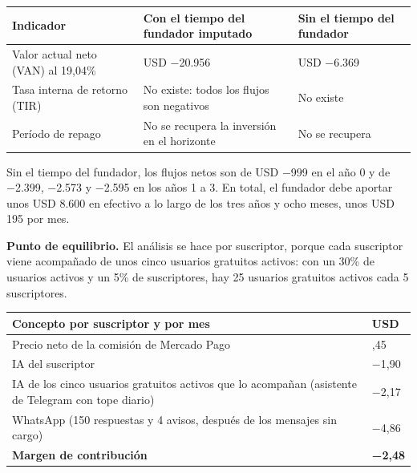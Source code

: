 {\def\LTcaptype{none} %
\begin{longtable}[]{@{}
  >{\raggedright\arraybackslash}p{}
  >{\raggedright\arraybackslash}p{}
  >{\raggedright\arraybackslash}p{}@{}}
\toprule\noalign{}
\begin{minipage}[b]{\linewidth}\raggedright
Indicador
\end{minipage} & \begin{minipage}[b]{\linewidth}\raggedright
Con el tiempo del fundador imputado
\end{minipage} & \begin{minipage}[b]{\linewidth}\raggedright
Sin el tiempo del fundador
\end{minipage} \\
\midrule\noalign{}
\endhead
\bottomrule\noalign{}
\endlastfoot
Valor actual neto (VAN) al 19,04\% & USD −20.956 & USD −6.369 \\
Tasa interna de retorno (TIR) & No existe: todos los flujos son
negativos & No existe \\
Período de repago & No se recupera la inversión en el horizonte & No se
recupera \\
\end{longtable}
}

Sin el tiempo del fundador, los flujos netos son de USD −999 en el año 0
y de −2.399, −2.573 y −2.595 en los años 1 a 3. En total, el fundador
debe aportar unos USD 8.600 en efectivo a lo largo de los tres años y
ocho meses, unos USD 195 por mes.

\textbf{Punto de equilibrio.} El análisis se hace por suscriptor, porque
cada suscriptor viene acompañado de unos cinco usuarios gratuitos
activos: con un 30\% de usuarios activos y un 5\% de suscriptores, hay
25 usuarios gratuitos activos cada 5 suscriptores.

{\def\LTcaptype{none} %
\begin{longtable}[]{@{}
  >{\raggedright\arraybackslash}p{}
  >{\raggedright\arraybackslash}p{}@{}}
\toprule\noalign{}
\begin{minipage}[b]{\linewidth}\raggedright
Concepto por suscriptor y por mes
\end{minipage} & \begin{minipage}[b]{\linewidth}\raggedright
USD
\end{minipage} \\
\midrule\noalign{}
\endhead
\bottomrule\noalign{}
\endlastfoot
Precio neto de la comisión de Mercado Pago & 6,45 \\
IA del suscriptor & −1,90 \\
IA de los cinco usuarios gratuitos activos que lo acompañan (asistente
de Telegram con tope diario) & −2,17 \\
WhatsApp (150 respuestas y 4 avisos, después de los mensajes sin cargo)
& −4,86 \\
\textbf{Margen de contribución} & \textbf{−2,48} \\
\end{longtable}
}

